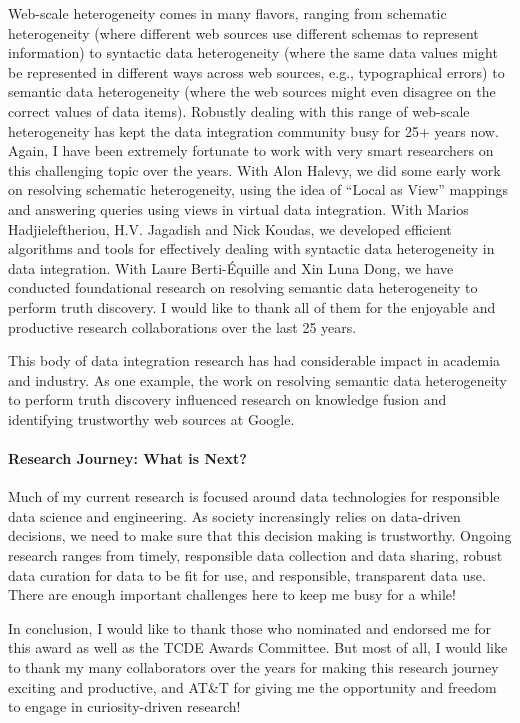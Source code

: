 \documentclass[11pt]{article}
\begin{document}
Web-scale heterogeneity comes in many flavors, ranging from schematic
heterogeneity (where different web sources use different schemas to 
represent information) to syntactic data heterogeneity (where the 
same data values might be represented in different ways across web
sources, e.g., typographical errors) to semantic data heterogeneity 
(where the web sources might even disagree on the correct values of 
data items).
Robustly dealing with this range of web-scale heterogeneity has kept 
the data integration community busy for 25+ years now. 
Again, I have been extremely fortunate to work with very smart 
researchers on this challenging topic over the years.
With Alon Halevy, we did some early work on resolving schematic 
heterogeneity, using the idea of ``Local as View'' mappings and 
answering queries using views in virtual data integration.
With Marios Hadjieleftheriou, H.V. Jagadish and Nick Koudas, we 
developed efficient algorithms and tools for effectively dealing with 
syntactic data heterogeneity in data integration.
With Laure Berti-\'{E}quille and Xin Luna Dong, we have conducted
foundational research on resolving semantic data heterogeneity to
perform truth discovery.
I would like to thank all of them for the enjoyable and productive
research collaborations over the last 25 years.

This body of data integration research has had considerable impact 
in academia and industry.
As one example, the work on resolving semantic data heterogeneity
to perform truth discovery influenced research on knowledge fusion 
and identifying trustworthy web sources at Google.

\paragraph{Research Journey: What is Next?}
Much of my current research is focused around data technologies for
responsible data science and engineering.
As society increasingly relies on data-driven decisions, we need
to make sure that this decision making is trustworthy.
Ongoing research ranges from timely, responsible data collection 
and data sharing, robust data curation for data to be fit for use,
and responsible, transparent data use.
There are enough important challenges here to keep me busy for a while!

\vspace*{0.1in}

In conclusion, I would like to thank those who nominated and endorsed
me for this award as well as the TCDE Awards Committee.
But most of all, I would like to thank my many collaborators over the
years for making this research journey exciting and productive,
and AT\&T for giving me the opportunity and freedom to engage in
curiosity-driven research!


\end{document}
